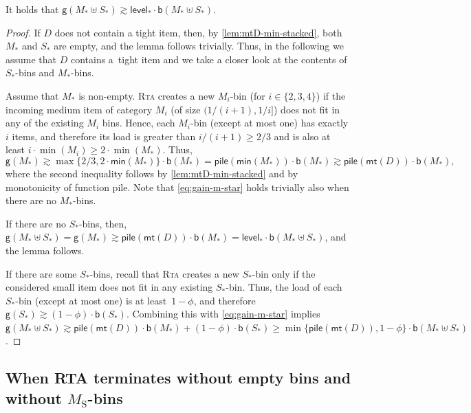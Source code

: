 \documentclass[a4paper,USenglish,cleveref]{lipics-v2019}
\newcommand{\M}{\ensuremath{M_\mathrm{S}}\xspace}
\newcommand{\ST}{\ensuremath{S_*}\xspace}
\newcommand{\MT}{\ensuremath{M_*}\xspace}
\newcommand{\MTI}[1]{\ensuremath{M_{#1}\xspace}}
\newcommand{\D}{\ensuremath{D}\xspace}
\newcommand{\smallBoundary}{\ensuremath{\phi}}
\newcommand{\B}{\textsf{b}}
\newcommand{\gain}{\textsf{g}}
\newcommand{\stack}{\textsf{pile}}
\newcommand{\level}{\textsf{level}_*}
\newcommand{\mn}{\textsf{min}}
\newcommand{\mt}{\textsf{mt}(\D)}
\newcommand{\ALG}{\textsc{Rta}\xspace}
\begin{document}
\begin{lemma}
\label{lem:stacking-gain}
It holds that
$\gain(\MT \uplus \ST) \gtrsim \level \cdot \B(\MT \uplus \ST)$.
\end{lemma}

\begin{proof}
If \D does not contain a tight item, then, by \cref{lem:mtD-min-stacked}, both
\MT and \ST are empty, and the lemma follows trivially. Thus, in the
following we assume that \D contains a~tight item and we take a closer look at
the contents of \ST-bins and \MT-bins.

Assume that \MT is non-empty. \ALG creates a new $\MTI{i}$-bin (for $i \in \{2,3,4\}$) 
if the incoming medium item of category $\MTI{i}$ (of size $(1/(i+1),1/i]$) 
does not fit in any of the existing $\MTI{i}$ bins. 
Hence, each $\MTI{i}$-bin (except at most one) has exactly $i$ items, and therefore its
load is greater than $i/(i+1) \geq 2/3$ and is also at least $i \cdot \min(\MTI{i}) 
\geq 2 \cdot \min(\MT)$. Thus, 
\begin{equation}
\label{eq:gain-m-star}
  \gain(\MT) 
  \gtrsim \max \{2/3, 2 \cdot \mn(\MT) \} \cdot \B(\MT) = 
  \stack(\mn(\MT)) \cdot \B(\MT) \gtrsim \stack(\mt) \cdot \B(\MT),
\end{equation}
where the second inequality follows by \cref{lem:mtD-min-stacked} and by
monotonicity of function \stack. Note that \eqref{eq:gain-m-star} holds
trivially also when there are no \MT-bins.

If there are no \ST-bins, then, $\gain(\MT \uplus \ST) = 
\gain(\MT) \gtrsim \stack(\mt) \cdot \B(\MT) = \level \cdot \B(\MT \uplus \ST)$,
and the lemma follows. 

If there are some \ST-bins, recall that \ALG creates a new \ST-bin only if
the considered small item does not fit in any existing \ST-bin. Thus, the load
of each \ST-bin (except at most one) is at least~$1-\smallBoundary$, and
therefore $\gain(\ST) \gtrsim (1-\smallBoundary)\cdot \B(\ST)$. Combining this
with \eqref{eq:gain-m-star} implies $\gain(\MT \uplus \ST) \gtrsim \stack(\mt)
\cdot \B(\MT) + (1-\smallBoundary)\cdot \B(\ST) \geq \min \{\stack(\mt),
1-\smallBoundary \} \cdot \B(\MT \uplus \ST)$.
\end{proof}



\subsection{When RTA terminates without empty bins and without \texorpdfstring{\M-bins}{MS-bins}}
\label{sec:no-m-bin}
\end{document}
